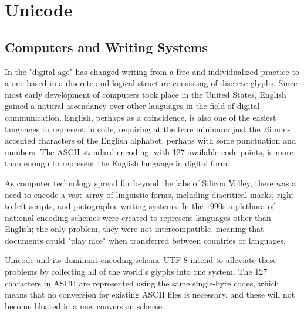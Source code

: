 \section{Unicode}

\subsection{Computers and Writing Systems}

In the "digital age" has changed writing from a free and individualized practice to
a one based in a discrete and logical structure consisting of discrete glyphs.
Since most early development of computers took place in the United States,
English gained a natural ascendancy over other languages in the field of digital
communication. English, perhaps as a coincidence, is also one of the easiest
languages to represent in code, requiring at the bare minimum just the 26
non-accented characters of the English alphabet, perhaps with some punctuation
and numbers. The ASCII standard encoding, with 127 available code points, is
more than enough to represent the English language in digital form.

As computer technology spread far beyond the labs of Silicon Valley, there was a
need to encode a vast array of linguistic forms, including diacritical marks,
right-to-left scripts, and pictographic writing systems. In the 1990s a plethora
of national encoding schemes were created to represent languages other than
English; the only problem, they were not intercompatible, meaning that documents
could "play nice" when transferred between countries or languages.

Unicode and its dominant encoding scheme UTF-8 intend to alleviate these
problems by collecting all of the world's glyphs into one system. The 127
characters in ASCII are represented using the same single-byte codes, which
means that no conversion for existing ASCII files is necessary, and these will
not become bloated in a new conversion scheme.
